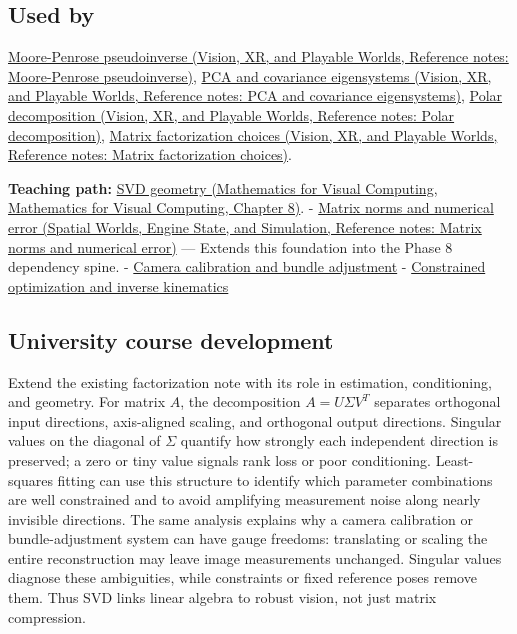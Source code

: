 \subsection{Used by}\label{appendix-1fad5e7f36fa-used-by}

\href{../07-Vision-XR-and-Playable-Worlds/main.pdf\#nameddest=appendix-541306fdbc1b}{Moore-Penrose pseudoinverse (Vision, XR, and Playable Worlds, Reference notes: Moore-Penrose pseudoinverse)}, \href{../07-Vision-XR-and-Playable-Worlds/main.pdf\#nameddest=appendix-ad175ef3c5bf}{PCA and covariance eigensystems (Vision, XR, and Playable Worlds, Reference notes: PCA and covariance eigensystems)}, \href{../07-Vision-XR-and-Playable-Worlds/main.pdf\#nameddest=appendix-73f5bcf7a462}{Polar decomposition (Vision, XR, and Playable Worlds, Reference notes: Polar decomposition)}, \href{../07-Vision-XR-and-Playable-Worlds/main.pdf\#nameddest=appendix-221a483bec2d}{Matrix factorization choices (Vision, XR, and Playable Worlds, Reference notes: Matrix factorization choices)}.

\textbf{Teaching path:} \href{../02-Mathematics-for-Visual-Computing/main.pdf\#nameddest=02-foundations-ii-ch024-singular-value-decomposition-covers-every-rectangular-map}{SVD geometry (Mathematics for Visual Computing, Mathematics for Visual Computing, Chapter 8)}. - \href{../05-Spatial-Worlds-Engine-State-and-Simulation/main.pdf\#nameddest=appendix-f8657bac66e5}{Matrix norms and numerical error (Spatial Worlds, Engine State, and Simulation, Reference notes: Matrix norms and numerical error)} --- Extends this foundation into the Phase 8 dependency spine. - \hyperref[appendix-3ee9861904d5]{Camera calibration and bundle adjustment} - \hyperref[appendix-29f4bea4c2bb]{Constrained optimization and inverse kinematics}

\subsection{University course development}\label{appendix-1fad5e7f36fa-university-course-development}

Extend the existing factorization note with its role in estimation, conditioning, and geometry. For matrix \(A\), the decomposition \(A=U\Sigma V^T\) separates orthogonal input directions, axis-aligned scaling, and orthogonal output directions. Singular values on the diagonal of \(\Sigma\) quantify how strongly each independent direction is preserved; a zero or tiny value signals rank loss or poor conditioning. Least-squares fitting can use this structure to identify which parameter combinations are well constrained and to avoid amplifying measurement noise along nearly invisible directions. The same analysis explains why a camera calibration or bundle-adjustment system can have gauge freedoms: translating or scaling the entire reconstruction may leave image measurements unchanged. Singular values diagnose these ambiguities, while constraints or fixed reference poses remove them. Thus SVD links linear algebra to robust vision, not just matrix compression.

